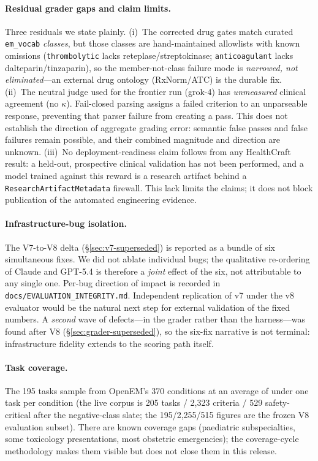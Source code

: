 \paragraph{Residual grader gaps and claim limits.}
Three residuals we state plainly. (i)~The corrected drug gates match curated
\texttt{em\_vocab} \emph{classes}, but those classes are hand-maintained
allowlists with known omissions (\texttt{thrombolytic} lacks
reteplase/streptokinase; \texttt{anticoagulant} lacks dalteparin/tinzaparin),
so the member-not-class failure mode is \emph{narrowed, not eliminated}---an
external drug ontology (RxNorm/ATC) is the durable fix. (ii)~The neutral judge
used for the frontier run (grok-4) has \emph{unmeasured} clinical agreement
(no $\kappa$). Fail-closed parsing assigns a failed criterion to an
unparseable response, preventing that parser failure from creating a pass.
This does not establish the direction of aggregate grading error: semantic
false passes and false failures remain possible, and their combined magnitude
and direction are unknown.
(iii)~No deployment-readiness claim follows from any HealthCraft result: a
held-out, prospective clinical validation has not been performed, and
a model trained against this reward is a research artifact behind a
\texttt{ResearchArtifactMetadata} firewall. This lack limits the claims; it
does not block publication of the automated engineering evidence.

\paragraph{Infrastructure-bug isolation.}
The V7-to-V8 delta (\S\ref{sec:v7-superseded}) is reported as a bundle
of six simultaneous fixes. We did not ablate individual bugs; the
qualitative re-ordering of Claude and GPT-5.4 is therefore a
\emph{joint} effect of the six, not attributable to any single one.
Per-bug direction of impact is recorded in
\texttt{docs/EVALUATION\_INTEGRITY.md}. Independent replication of v7
under the v8 evaluator would be the natural next step for
external validation of the fixed numbers. A \emph{second} wave of
defects---in the grader rather than the harness---was found after V8
(\S\ref{sec:grader-superseded}), so the six-fix narrative is not terminal:
infrastructure fidelity extends to the scoring path itself.

\paragraph{Task coverage.}
The 195 tasks sample from OpenEM's 370 conditions at an average of
under one task per condition (the live corpus is 205 tasks / 2{,}323
criteria / 529 safety-critical after the negative-class slate; the
195/2{,}255/515 figures are the frozen V8 evaluation subset). There are
known coverage gaps
(paediatric subspecialties, some toxicology presentations, most
obstetric emergencies); the coverage-cycle methodology makes them
visible but does not close them in this release.

